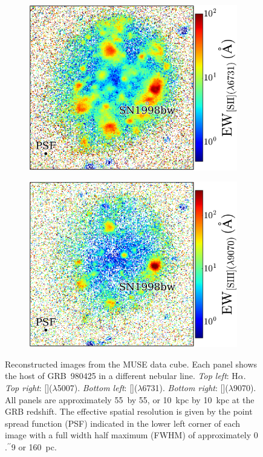 \documentclass[traditabstract]{aa}
\newcommand{\farc}{\hbox{$.\!\!^{\prime\prime}$}}
\newcommand{\ha}{H$\alpha$}
\newcommand{\sii}{[\ion{S}{ii}]}
\newcommand{\siii}{[\ion{S}{iii}]}
\newcommand{\oiii}{[\ion{O}{iii}]}
\begin{document}
\begin{figure}
\begin{subfigure}{.2425\textwidth}
  \includegraphics[width=1.0\linewidth]{Figs/MUSE_SN1998bw_SIIEW.pdf}
\end{subfigure}
\begin{subfigure}{.2425\textwidth}
  \includegraphics[width=1.0\linewidth]{Figs/MUSE_SN1998bw_SIIIEW.pdf}
\end{subfigure}
\caption{Reconstructed images from the MUSE data cube. Each panel shows the host of GRB~980425 in a different nebular line. \textit{Top left}: \ha. \textit{Top right}: \oiii($\lambda$5007). \textit{Bottom left}:  \sii($\lambda$6731). \textit{Bottom right}:  \siii($\lambda$9070). All panels are approximately 55\arcsec~by 55\arcsec, or 10~kpc by 10~kpc at the GRB redshift. The effective spatial resolution is given by the point spread function (PSF) indicated in the lower left corner of each image with a full width half maximum (FWHM) of approximately 0\farc{9} or 160~pc.}
\label{fig:EW}
\end{figure}
\end{document}
